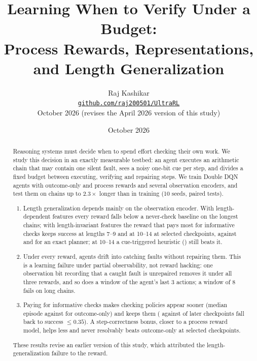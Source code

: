 \documentclass{article}
\title{Learning When to Verify Under a Budget:\\Process Rewards, Representations,\\and Length Generalization}
\author{Raj Kashikar\\\texttt{\href{https://github.com/raj200501/UltraRL}{github.com/raj200501/UltraRL}}\\October 2026 (revises the April 2026 version of this study)}
\date{October 2026}
\begin{document}
\maketitle

\begin{abstract}
Reasoning systems must decide when to spend effort checking their own work. We study this decision in an exactly measurable testbed: an agent executes an arithmetic chain that may contain one silent fault, sees a noisy one-bit cue per step, and divides a fixed budget between executing, verifying and repairing steps. We train Double DQN agents with outcome-only and process rewards and several observation encoders, and test them on chains up to $2.3\times$ longer than in training (10 seeds, paired tests).
\begin{enumerate}
  \item Length generalization depends mainly on the observation encoder. With length-dependent features every reward falls below a never-check baseline on the longest chains; with length-invariant features the reward that pays most for informative checks keeps  success at lengths 7--9 and  at 10--14 at selected checkpoints, against  and  for an exact planner; at 10--14 a cue-triggered heuristic () still beats it.
  \item Under every reward, agents drift into catching faults without repairing them. This is a learning failure under partial observability, not reward hacking: one observation bit recording that a caught fault is unrepaired removes it under all three rewards, and so does a window of the agent's last 3 actions; a window of 8 fails on long chains.
  \item Paying for informative checks makes checking policies appear sooner (median episode  against  for outcome-only) and keeps them ( against  of later checkpoints fall back to success $\le 0.35$). A step-correctness bonus, closer to a process reward model, helps less and never resolvably beats outcome-only at selected checkpoints.
\end{enumerate}
These results revise an earlier version of this study, which attributed the length-generalization failure to the reward.
\end{abstract}









\appendix

\end{document}

